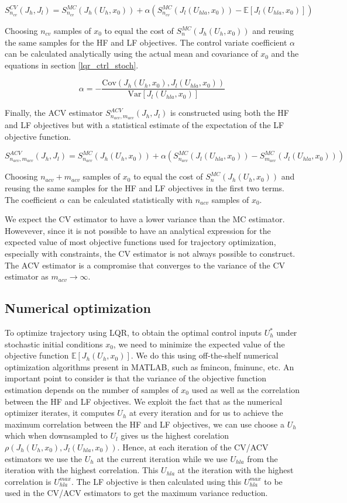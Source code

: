 \documentclass{article}
\begin{document}
$$
S_{n_{cv}}^{CV}(J_h, J_l) = S_{n_{cv}}^{MC}(J_h(U_h, x_0)) + \alpha (S_{n_{cv}}^{MC}(J_l(U_{hla}, x_0)) - \mathbb{E}[J_l(U_{hla}, x_0)])
$$

Choosing $n_{cv}$ samples of $x_0$ to equal the cost of $S_n^{MC}(J_h(U_h, x_0))$ and reusing the same samples for the HF and LF objectives.
The control variate coefficient $\alpha$ can be calculated analytically using the actual mean and covariance of $x_0$
and the equations in section \ref{lqr_ctrl_stoch}.

$$
\alpha = -\frac{\text{Cov}(J_h(U_h, x_0), J_l(U_{hla}, x_0))}{\text{Var}[J_l(U_{hla}, x_0)]}
$$

Finally, the ACV estimator $S_{n_{acv},m_{acv}}^{ACV}(J_h, J_l)$ is constructed using both the HF and LF objectives but with
a statistical estimate of the expectation of the LF objective function.

$$
S_{n_{acv},m_{acv}}^{ACV}(J_h, J_l) = S_{n_{acv}}^{MC}(J_h(U_h, x_0)) + \alpha (S_{n_{acv}}^{MC}(J_l(U_{hla}, x_0)) - S_{m_{acv}}^{MC}(J_l(U_{hla}, x_0)))
$$

Choosing $n_{acv} + m_{acv}$ samples of $x_0$ to equal the cost of $S_n^{MC}(J_h(U_h, x_0))$ and reusing the same samples
for the HF and LF objectives in the first two terms. The coefficient $\alpha$ can be calculated statistically with $n_{acv}$ samples of $x_0$.

We expect the CV estimator to have a lower variance than the MC estimator. Howevever, since it is not possible
to have an analytical expression for the expected value of most objective functions used for trajectory optimization,
especially with constraints, the CV estimator is not always possible to construct. The ACV estimator is a compromise
that converges to the variance of the CV estimator as $m_{acv} \rightarrow \infty$.

\subsection{Numerical optimization}

To optimize trajectory using LQR, to obtain the optimal control inputs $U_h^*$ under stochastic initial conditions $x_0$,
we need to minimize the expected value of the objective function $\mathbb{E}[J_h(U_h, x_0)]$. We do this using off-the-shelf
numerical optimization algorithms present in MATLAB, such as fmincon, fminunc, etc. An important point to consider
is that the variance of the objective function estimation depends on the number of samples of $x_0$ used as well as
the correlation between the HF and LF objectives. We exploit the fact that as the numerical optimizer iterates, it computes
$U_h$ at every iteration and for us to achieve the maximum correlation between the HF and LF objectives, we can use
choose a $U_h$ which when downsampled to $U_l$ gives us the highest corelation $\rho(J_h(U_h, x_0), J_l(U_{hla}, x_0))$.
Hence, at each iteration of the CV/ACV estimators we use the $U_h$ at the current iteration while we use $U_{hla}$ from
the iteration with the highest correlation. This $U_{hla}$ at the iteration with the highest correlation is
$U_{hla}^{max}$. The LF objective is then calculated using this $U_{hla}^{max}$ to be used in the CV/ACV estimators to get the maximum variance reduction.
\end{document}
